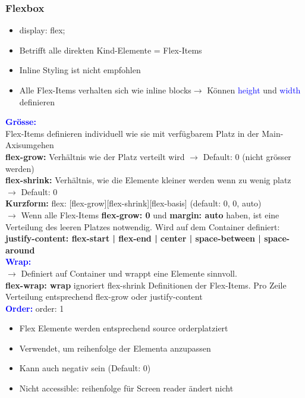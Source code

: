 \subsubsection{Flexbox}
\begin{itemize}[topsep=0pt, leftmargin=3mm]
    \setlength\itemsep{-0.3em}
    \item display: flex;
    \item Betrifft alle direkten Kind-Elemente = \dq Flex-Items\dq
    \item Inline Styling ist nicht empfohlen
    \item Alle Flex-Items verhalten sich wie \dq inline blocks\dq $\rightarrow$ Können \textcolor{blue}{height} und \textcolor{blue}{width} definieren
\end{itemize}
\textbf{\textcolor{blue}{Grösse:}}\\
Flex-Items definieren individuell wie sie mit verfügbarem Platz in der \dq Main-Axis\dq umgehen\\
\textbf{flex-grow:} Verhältnis wie der Platz verteilt wird $\rightarrow$ Default: 0 (nicht grösser werden)\\
\textbf{flex-shrink:} Verhältnis, wie die Elemente kleiner werden wenn zu wenig platz $\rightarrow$ Default: 0\\
\textbf{Kurzform:} flex: [flex-grow][flex-shrink][flex-basis] (default: 0, 0, auto)\\
$\rightarrow$ Wenn alle Flex-Items \textbf{flex-grow: 0} und \textbf{margin: auto} haben, ist eine Verteilung des leeren Platzes notwendig. Wird auf dem Container definiert: \textbf{justify-content: flex-start | flex-end | center | space-between | space-around}\\
\textbf{\textcolor{blue}{Wrap:}}\\
$\rightarrow$ Definiert auf Container und wrappt eine Elemente sinnvoll.\\
\textbf{flex-wrap: wrap} ignoriert flex-shrink Definitionen der Flex-Items. Pro Zeile Verteilung entsprechend flex-grow oder justify-content\\
\textbf{\textcolor{blue}{Order:}} order: 1
\begin{itemize}[topsep=0pt, leftmargin=3mm]
    \setlength\itemsep{-0.3em}
    \item Flex Elemente werden entsprechend \dq source order\dq platziert
    \item Verwendet, um reihenfolge der Elementa anzupassen
    \item Kann auch negativ sein (Default: 0)
    \item Nicht \dq accessible\dq: reihenfolge für Screen reader ändert nicht
\end{itemize}
